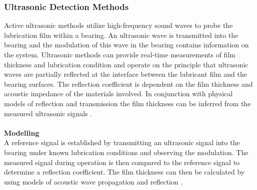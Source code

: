 \subsubsection{Ultrasonic Detection Methods}
Active ultrasonic methods utilize high-frequency sound waves to probe the lubrication film within a bearing. An ultrasonic wave is transmitted into the bearing and the modulation of this wave in the bearing contains information on the system. Ultrasonic methods can provide real-time measurements of film thickness and lubrication condition and operate on the principle that ultrasonic waves are partially reflected at the interface between the lubricant film and the bearing surfaces. The reflection coefficient is dependent on the film thickness and acoustic impedance of the materials involved. In conjunction with physical models of reflection and transmission the film thickness can be inferred from the measured ultrasonic signals \cite{chen_evaluation_2023} \cite{chen_sub-nyquist_2025} \cite{drinkwater_ultrasonic_2009}.
\\\\
\textbf{Modelling}\\
A reference signal is established by transmitting an ultrasonic signal into the bearing under known lubrication conditions and observing the modulation. The measured signal during operation is then compared to the reference signal to determine a reflection coefficient. The film thickness can then be calculated by using models of acoustic wave propagation and reflection \cite{chen_evaluation_2023} \cite{drinkwater_ultrasonic_2009}.

